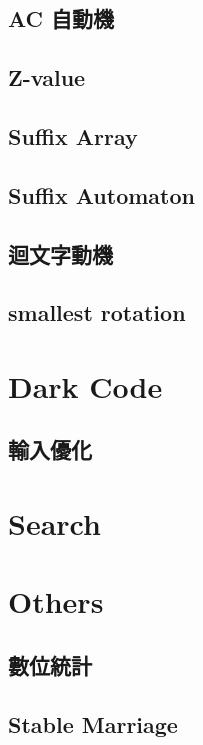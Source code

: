 \subsection{AC 自動機}

\subsection{Z-value}

\subsection{Suffix Array}

\subsection{Suffix Automaton}

\subsection{迴文字動機}

\subsection{smallest rotation}


\section{Dark Code}

\subsection{輸入優化}


\section{Search}


\section{Others}

\subsection{數位統計}

\subsection{Stable Marriage}

